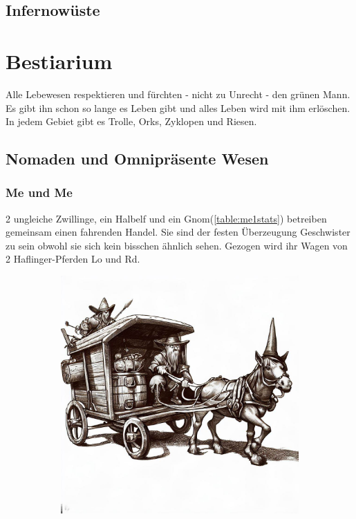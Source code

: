 \documentclass[11pt, twoside]{article}
\begin{document}
\subsection{Infernowüste}
\label{sec:orgb868da2}

\newpage

\section{Bestiarium}
\label{sec:org9286cee}
Alle Lebewesen respektieren und fürchten - nicht zu Unrecht - den grünen Mann. Es gibt ihn schon so lange es Leben gibt und alles Leben wird mit ihm erlöschen.
In jedem Gebiet gibt es Trolle, Orks, Zyklopen und Riesen.

\clearpage

\subsection{Nomaden und Omnipräsente Wesen}
\label{sec:orgcfd82a4}
\subsubsection{Me und Me\label{meme}}
\label{sec:orgb0af2ea}
2 ungleiche Zwillinge, ein Halbelf und ein Gnom(\ref{table:me1stats}) betreiben gemeinsam einen fahrenden Handel. Sie sind der festen Überzeugung Geschwister zu sein obwohl sie sich kein bisschen ähnlich sehen. Gezogen wird ihr Wagen von 2 Haflinger-Pferden Lo und Rd.
\begin{figure}[H]
\centering
\caption{Die Händler Me und Me}
\label{fig:meme}
  \begin{subfigure}{0.5\textwidth}
    \centering
    \includegraphics[width=0.99\linewidth]{meme.jpeg}
  \end{subfigure}
\end{figure}
\end{document}
